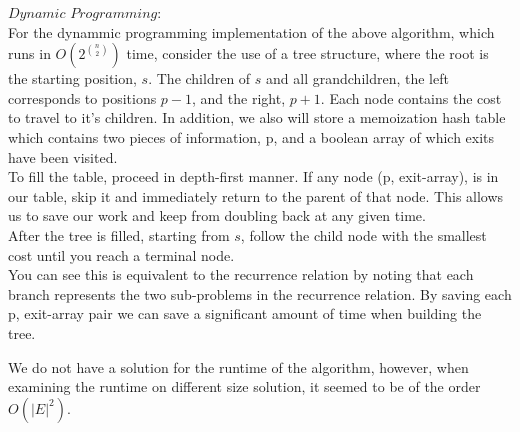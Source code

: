 \documentclass{article}
\begin{document}
\begin{enumerate}
$Dynamic$ $Programming:$\\

For the dynammic programming implementation of the above algorithm, which runs in $O(2^{n \choose 2})$  time, consider the use of a tree structure, where the root is the starting position, $s$. The children of $s$ and all grandchildren, the left corresponds to positions $p-1$, and the right, $p+1$. Each node contains the cost to travel to it's children. In addition, we also will store a memoization hash table which contains two pieces of information, p, and a boolean array of which exits have been visited.\\
To fill the table, proceed in depth-first manner. If any node (p, exit-array), is in our table, skip it and immediately return to the parent of that node. This allows us to save our work and keep from doubling back at any given time.\\
After the tree is filled, starting from $s$, follow the child node with the smallest cost until you reach a terminal node.\\

You can see this is equivalent to the recurrence relation by noting that each branch represents the two sub-problems in the recurrence relation. By saving each p, exit-array pair we can save a significant amount of time when building the tree.

We do not have a solution for the runtime of the algorithm, however, when examining the runtime on different size solution, it seemed to be of the order $O(|E|^2)$. 

\end{enumerate}
\end{document}
